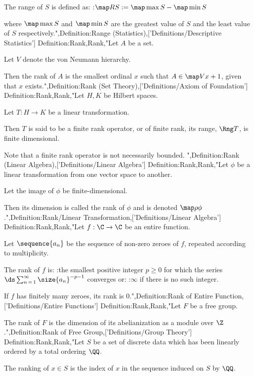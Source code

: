 The range of $S$ is defined as:
:$\map R S := \map \max S - \map \min S$

where $\map \max S$ and $\map \min S$ are the greatest value of $S$ and the least value of $S$ respectively.",Definition:Range (Statistics),['Definitions/Descriptive Statistics']
Definition:Rank,Rank,"Let $A$ be a set.

Let $V$ denote the von Neumann hierarchy.


Then the rank of $A$ is the smallest ordinal $x$ such that $A \in \map V {x + 1}$, given that $x$ exists.",Definition:Rank (Set Theory),['Definitions/Axiom of Foundation']
Definition:Rank,Rank,"Let $H, K$ be Hilbert spaces.

Let $T: H \to K$ be a linear transformation.


Then $T$ is said to be a finite rank operator, or of finite rank,  its range, $\Rng T$, is finite dimensional.

Note that a finite rank operator is not necessarily bounded.
",Definition:Rank (Linear Algebra),['Definitions/Linear Algebra']
Definition:Rank,Rank,"Let $\phi$ be a linear transformation from one vector space to another.

Let the image of $\phi$ be finite-dimensional.


Then its dimension is called the rank of $\phi$ and is denoted $\map \rho \phi$.",Definition:Rank/Linear Transformation,['Definitions/Linear Algebra']
Definition:Rank,Rank,"Let $f: \C \to \C$ be an entire function.

Let $\sequence {a_n}$ be the sequence of non-zero zeroes of $f$, repeated according to multiplicity.


The rank of $f$ is:
:the smallest positive integer $p \ge 0$ for which the series $\ds \sum_{n \mathop = 1}^\infty \size {a_n}^{-p - 1}$ converges
or:
:$\infty$ if there is no such integer.


If $f$ has finitely many zeroes, its rank is $0$.",Definition:Rank of Entire Function,['Definitions/Entire Functions']
Definition:Rank,Rank,"Let $F$ be a free group.


The rank of $F$ is the dimension of its abelianization as a module over $\Z$.",Definition:Rank of Free Group,['Definitions/Group Theory']
Definition:Rank,Rank,"Let $S$ be a set of discrete data which has been linearly ordered by a total ordering $\QQ$.

The ranking of $x \in S$ is the index of $x$ in the sequence induced on $S$ by $\QQ$.




